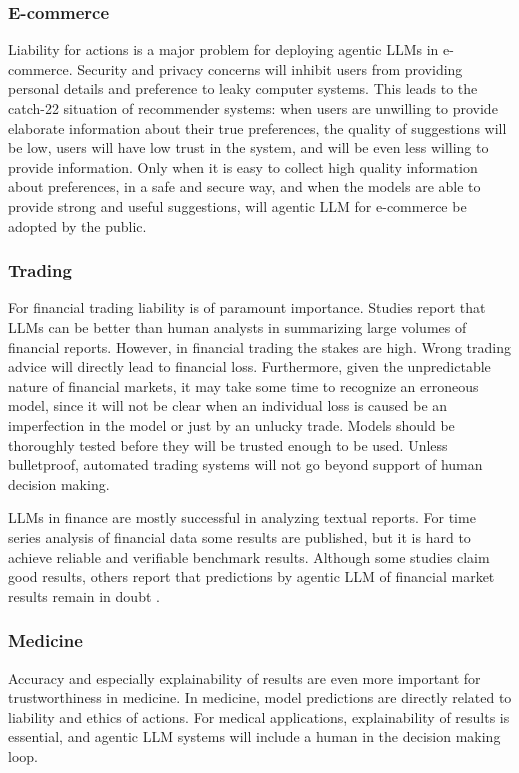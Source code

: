 \subsubsection{E-commerce}
Liability for actions is a major problem for deploying agentic LLMs in e-commerce. Security and privacy concerns will inhibit users from  providing personal details and preference to leaky computer systems. This leads to the catch-22 situation of recommender systems: when users are unwilling to provide elaborate information about their true preferences, the quality of suggestions will be low, users will have low trust in the system, and will be even less willing to provide information. Only when it is easy to collect high quality information about preferences, in a safe and secure way, and when the models are able to provide strong and useful suggestions, will agentic LLM for e-commerce be adopted by the public.

\subsubsection{Trading}
For financial trading liability is of paramount  importance. 
Studies report that LLMs can be better than human analysts in summarizing large volumes of financial reports. However, in financial trading the stakes are high. Wrong trading advice will directly lead to financial loss. Furthermore, given the unpredictable nature of financial markets, it may take some time to recognize an erroneous model, since it will not be clear when an individual loss is caused be an imperfection in the model or just by an unlucky trade. Models should be thoroughly tested before they will be trusted enough to be used. Unless bulletproof, automated trading systems will not go beyond support of human decision making.

LLMs in finance are mostly successful in analyzing textual reports. For time series analysis of financial data some results are published, but it is hard to achieve reliable and verifiable benchmark results.
Although some studies claim good results, others report that predictions by agentic LLM of financial market results remain in doubt \citep{li2026can}. %

 


\subsubsection{Medicine}
Accuracy and especially explainability of results are even more important for trustworthiness in medicine. In medicine, model predictions are directly related  to liability and ethics of actions. For medical applications, explainability of results is essential, and agentic LLM systems will include a human in the decision making loop.

